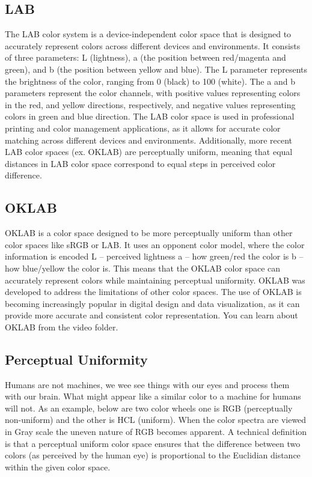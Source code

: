 \documentclass[
  letterpaper,
]{book}
\begin{document}
\hypertarget{lab}{%
\subsection{LAB}\label{lab}}

The LAB color system is a device-independent color space that is
designed to accurately represent colors across different devices and
environments. It consists of three parameters: L (lightness), a (the
position between red/magenta and green), and b (the position between
yellow and blue). The L parameter represents the brightness of the
color, ranging from 0 (black) to 100 (white). The a and b parameters
represent the color channels, with positive values representing colors
in the red, and yellow directions, respectively, and negative values
representing colors in green and blue direction. The LAB color space is
used in professional printing and color management applications, as it
allows for accurate color matching across different devices and
environments. Additionally, more recent LAB color spaces (ex. OKLAB) are
perceptually uniform, meaning that equal distances in LAB color space
correspond to equal steps in perceived color difference.

\hypertarget{oklab}{%
\subsection{OKLAB}\label{oklab}}

OKLAB is a color space designed to be more perceptually uniform than
other color spaces like sRGB or LAB. It uses an opponent color model,
where the color information is encoded L -- perceived lightness a -- how
green/red the color is b -- how blue/yellow the color is. This means
that the OKLAB color space can accurately represent colors while
maintaining perceptual uniformity. OKLAB was developed to address the
limitations of other color spaces. The use of OKLAB is becoming
increasingly popular in digital design and data visualization, as it can
provide more accurate and consistent color representation. You can learn
about OKLAB from the video folder.

\hypertarget{perceptual-uniformity}{%
\subsection{Perceptual Uniformity}\label{perceptual-uniformity}}

Humans are not machines, we wee see things with our eyes and process
them with our brain. What might appear like a similar color to a machine
for humans will not. As an example, below are two color wheels one is
RGB (perceptually non-uniform) and the other is HCL (uniform). When the
color spectra are viewed in Gray scale the uneven nature of RGB becomes
apparent. A technical definition is that a perceptual uniform color
space ensures that the difference between two colors (as perceived by
the human eye) is proportional to the Euclidian distance within the
given color space.
\end{document}
